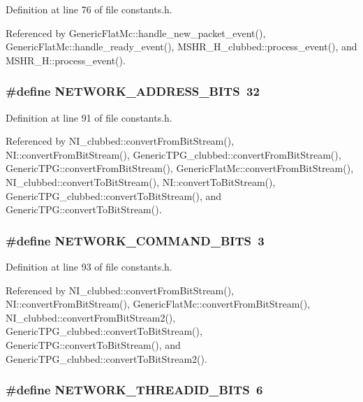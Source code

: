 Definition at line 76 of file constants.h.

Referenced by GenericFlatMc::handle\_\-new\_\-packet\_\-event(), GenericFlatMc::handle\_\-ready\_\-event(), MSHR\_\-H\_\-clubbed::process\_\-event(), and MSHR\_\-H::process\_\-event().
\subsubsection[{NETWORK\_\-ADDRESS\_\-BITS}]{\setlength{\rightskip}{0pt plus 5cm}\#define NETWORK\_\-ADDRESS\_\-BITS~32}\label{constants_8h_8f3a5746d22adbc2a68091b4292978a2}




Definition at line 91 of file constants.h.

Referenced by NI\_\-clubbed::convertFromBitStream(), NI::convertFromBitStream(), GenericTPG\_\-clubbed::convertFromBitStream(), GenericTPG::convertFromBitStream(), GenericFlatMc::convertFromBitStream(), NI\_\-clubbed::convertToBitStream(), NI::convertToBitStream(), GenericTPG\_\-clubbed::convertToBitStream(), and GenericTPG::convertToBitStream().
\subsubsection[{NETWORK\_\-COMMAND\_\-BITS}]{\setlength{\rightskip}{0pt plus 5cm}\#define NETWORK\_\-COMMAND\_\-BITS~3}\label{constants_8h_bfff7a5c1aab66967a8f2f26595dd59c}




Definition at line 93 of file constants.h.

Referenced by NI\_\-clubbed::convertFromBitStream(), NI::convertFromBitStream(), GenericFlatMc::convertFromBitStream(), NI\_\-clubbed::convertFromBitStream2(), GenericTPG\_\-clubbed::convertToBitStream(), GenericTPG::convertToBitStream(), and GenericTPG\_\-clubbed::convertToBitStream2().
\subsubsection[{NETWORK\_\-THREADID\_\-BITS}]{\setlength{\rightskip}{0pt plus 5cm}\#define NETWORK\_\-THREADID\_\-BITS~6}\label{constants_8h_3c72cb2ceba9fd5ec9d765851a065e23}




